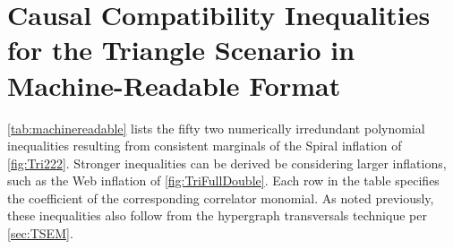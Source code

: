 \documentclass[aps,english,10pt,superscriptaddress,onecolumn,twoside,longbibliography,pra,floatfix,fleqn,nofootinbib]{revtex4-1}
\theoremstyle{definition}
\begin{document}
\section{Causal Compatibility Inequalities for the Triangle Scenario in Machine-Readable Format}
\label{sec:38ineqs}

\cref{tab:machinereadable} lists the fifty two numerically irredundant polynomial inequalities resulting from consistent marginals of the Spiral inflation of \cref{fig:Tri222}. Stronger inequalities can be derived be considering larger inflations, such as the Web inflation of \cref{fig:TriFullDouble}. Each row in the table specifies the coefficient of the corresponding correlator monomial. As noted previously, these inequalities also follow from the hypergraph transversals technique per \cref{sec:TSEM}.  
\end{document}
